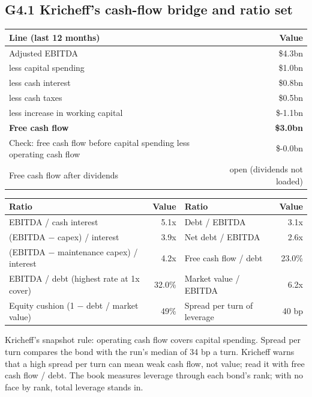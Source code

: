 \documentclass[11pt,a4paper]{article}
\begin{document}
\subsection*{G4.1 Kricheff's cash-flow bridge and ratio set}
\begin{center}\footnotesize\setlength{\tabcolsep}{3.5pt}\begin{tabular}{@{}lr@{}}\toprule
Line (last 12 months) & Value \\\midrule
Adjusted EBITDA & \$4.3bn \\
less capital spending & \$1.0bn \\
less cash interest & \$0.8bn \\
less cash taxes & \$0.5bn \\
less increase in working capital & \$-1.1bn \\
\textbf{Free cash flow} & \textbf{\$3.0bn} \\
Check: free cash flow before capital spending less operating cash flow & \$-0.0bn \\
Free cash flow after dividends & open (dividends not loaded) \\
\bottomrule\end{tabular}\end{center}
\begin{center}\footnotesize\setlength{\tabcolsep}{3.5pt}\begin{tabular}{@{}lrlr@{}}\toprule
Ratio & Value & Ratio & Value \\\midrule
EBITDA / cash interest & 5.1x & Debt / EBITDA & 3.1x \\
(EBITDA $-$ capex) / interest & 3.9x & Net debt / EBITDA & 2.6x \\
(EBITDA $-$ maintenance capex) / interest & 4.2x & Free cash flow / debt & 23.0\% \\
EBITDA / debt (highest rate at 1x cover) & 32.0\% & Market value / EBITDA & 6.2x \\
Equity cushion (1 $-$ debt / market value) & 49\% & Spread per turn of leverage & 40 bp \\
\bottomrule\end{tabular}\end{center}
Kricheff's snapshot rule: operating cash flow covers capital spending. Spread per turn compares the bond with the run's median of 34 bp a turn. Kricheff warns that a high spread per turn can mean weak cash flow, not value; read it with free cash flow / debt. The book measures leverage through each bond's rank; with no face by rank, total leverage stands in.
\end{document}
